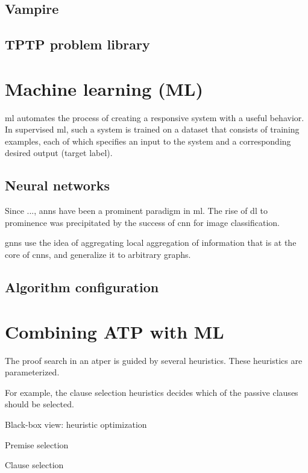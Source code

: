 \subsection{Vampire}

\subsection{TPTP problem library}

\section{Machine learning (ML)}

\Gls{ml} automates the process of creating a responsive system with a useful behavior.
In supervised \gls{ml}, such a system is trained on a dataset that consists of training examples,
each of which specifies an input to the system and a corresponding desired output (target label).

\subsection{Neural networks}

Since ..., \glspl{ann} have been a prominent paradigm in \gls{ml}.
The rise of \gls{dl} to prominence was precipitated by the success of \gls{cnn} for image classification.

\Glspl{gnn} use the idea of aggregating local aggregation of information that is at the core of \glspl{cnn}, and generalize it to arbitrary graphs.

\subsection{Algorithm configuration}

\section{Combining ATP with ML}

The proof search in an \gls{atper} is guided by several heuristics.
These heuristics are parameterized.

For example, the clause selection heuristics decides which of the passive clauses should be selected.

Black-box view: heuristic optimization

Premise selection

Clause selection

